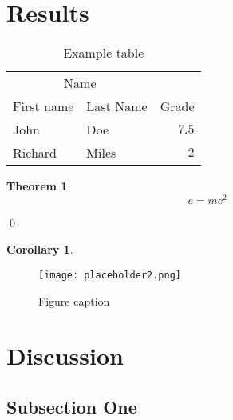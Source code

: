 \documentclass[a4paper]{article}
\theoremstyle{definition}
\newtheorem{theorem}{Theorem}
\newtheorem{corollary}{Corollary}
\renewenvironment{proof}{{\bfseries Proof.}}{\qed}
\begin{document}
\lipsum[4] %


\section{Results}

\begin{table}[H]
\caption{Example table}
\centering
\begin{tabular}{llr}
\toprule
\multicolumn{2}{c}{Name} \\
\cmidrule(r){1-2}
First name & Last Name & Grade \\
\midrule
John & Doe & $7.5$ \\
Richard & Miles & $2$ \\
\bottomrule
\end{tabular}
\end{table}

\lipsum[5] %

\begin{theorem}\label{th1} 
\begin{equation}
\label{eq:emc}
e = mc^2
\end{equation}
\end{theorem}

\begin{proof}
\lipsum[5] 
\end{proof}

\begin{corollary}\label{cor1}
\lipsum[1][1-2] 
\end{corollary}

\begin{figure}[ht]
\leavevmode
\centering \texttt{[image: placeholder2.png]}
\caption{Figure caption}
\end{figure}

\lipsum[6] %


\section{Discussion}

\subsection{Subsection One}
\end{document}
